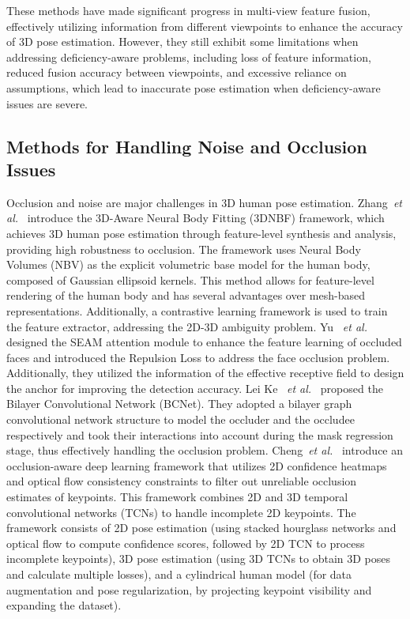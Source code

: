 These methods have made significant progress in multi-view feature fusion, effectively utilizing information from different viewpoints to enhance the accuracy of 3D pose estimation. 
However, they still exhibit some limitations when addressing deficiency-aware problems, including loss of feature information, reduced fusion accuracy between viewpoints, and excessive reliance on assumptions, which lead to inaccurate pose estimation when deficiency-aware issues are severe.

\subsection{Methods for Handling Noise and Occlusion Issues}
Occlusion and noise are major challenges in 3D human pose estimation. 
Zhang~\textit{et al.}~\cite{zhang20233d} introduce the 3D-Aware Neural Body Fitting (3DNBF) framework, which achieves 3D human pose estimation through feature-level synthesis and analysis, providing high robustness to occlusion. 
The framework uses Neural Body Volumes (NBV) as the explicit volumetric base model for the human body, composed of Gaussian ellipsoid kernels. 
This method allows for feature-level rendering of the human body and has several advantages over mesh-based representations. 
Additionally, a contrastive learning framework is used to train the feature extractor, addressing the 2D-3D ambiguity problem.
Yu ~\textit{et al.}~\cite{yu2024yolo} designed the SEAM attention module to enhance the feature learning of occluded faces and introduced the Repulsion Loss to address the face occlusion problem. Additionally, they utilized the information of the effective receptive field to design the anchor for improving the detection accuracy.
Lei Ke ~\textit{et al.}~\cite{ke2021deep} proposed the Bilayer Convolutional Network (BCNet). 
They adopted a bilayer graph convolutional network structure to model the occluder and the occludee respectively and took their interactions into account during the mask regression stage, thus effectively handling the occlusion problem.
Cheng~\textit{et al.}~\cite{cheng2019occlusion} introduce an occlusion-aware deep learning framework that utilizes 2D confidence heatmaps and optical flow consistency constraints to filter out unreliable occlusion estimates of keypoints. 
This framework combines 2D and 3D temporal convolutional networks (TCNs) to handle incomplete 2D keypoints. 
The framework consists of 2D pose estimation (using stacked hourglass networks and optical flow to compute confidence scores, followed by 2D TCN to process incomplete keypoints), 3D pose estimation (using 3D TCNs to obtain 3D poses and calculate multiple losses), and a cylindrical human model (for data augmentation and pose regularization, by projecting keypoint visibility and expanding the dataset). 


